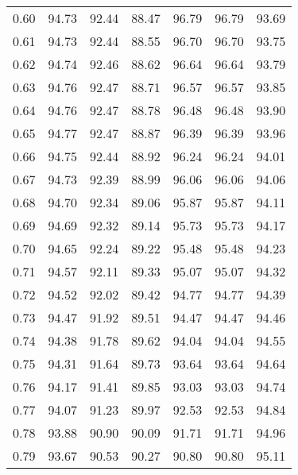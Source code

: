 \begin{tabular}{|c|c|c|c|c|c|c|}
      0.60 &     94.73 &     92.44 &      88.47 &   96.79 &      96.79 &         93.69 \\
      0.61 &     94.73 &     92.44 &      88.55 &   96.70 &      96.70 &         93.75 \\
      0.62 &     94.74 &     92.46 &      88.62 &   96.64 &      96.64 &         93.79 \\
      0.63 &     94.76 &     92.47 &      88.71 &   96.57 &      96.57 &         93.85 \\
      0.64 &     94.76 &     92.47 &      88.78 &   96.48 &      96.48 &         93.90 \\
      0.65 &     94.77 &     92.47 &      88.87 &   96.39 &      96.39 &         93.96 \\
      0.66 &     94.75 &     92.44 &      88.92 &   96.24 &      96.24 &         94.01 \\
      0.67 &     94.73 &     92.39 &      88.99 &   96.06 &      96.06 &         94.06 \\
      0.68 &     94.70 &     92.34 &      89.06 &   95.87 &      95.87 &         94.11 \\
      0.69 &     94.69 &     92.32 &      89.14 &   95.73 &      95.73 &         94.17 \\
      0.70 &     94.65 &     92.24 &      89.22 &   95.48 &      95.48 &         94.23 \\
      0.71 &     94.57 &     92.11 &      89.33 &   95.07 &      95.07 &         94.32 \\
      0.72 &     94.52 &     92.02 &      89.42 &   94.77 &      94.77 &         94.39 \\
      0.73 &     94.47 &     91.92 &      89.51 &   94.47 &      94.47 &         94.46 \\
      0.74 &     94.38 &     91.78 &      89.62 &   94.04 &      94.04 &         94.55 \\
      0.75 &     94.31 &     91.64 &      89.73 &   93.64 &      93.64 &         94.64 \\
      0.76 &     94.17 &     91.41 &      89.85 &   93.03 &      93.03 &         94.74 \\
      0.77 &     94.07 &     91.23 &      89.97 &   92.53 &      92.53 &         94.84 \\
      0.78 &     93.88 &     90.90 &      90.09 &   91.71 &      91.71 &         94.96 \\
      0.79 &     93.67 &     90.53 &      90.27 &   90.80 &      90.80 &         95.11 \\

\end{tabular}
